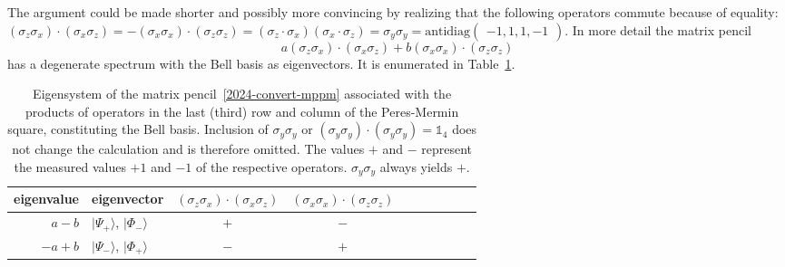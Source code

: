 \documentclass[
  twocolumn,
 showpacs,
 showkeys,
 preprintnumbers,
 amsmath,amssymb,
 aps,
 prl,
  longbibliography,
 floatfix,
 ]{revtex4-2}
\newcommand\myotimes{ }
\begin{document}
The argument could be made shorter and possibly more convincing by realizing that the following operators commute because of equality:
$
(\sigma_z \myotimes \sigma_x) \cdot (\sigma_x \myotimes \sigma_z) = -(\sigma_x \myotimes \sigma_x) \cdot (\sigma_z \myotimes \sigma_z)
=
(\sigma_z \cdot \sigma_x ) \myotimes (\sigma_x \cdot \sigma_z)
=   \sigma_y  \myotimes \sigma_y
= \text{antidiag}
\begin{pmatrix} -1 , 1 ,1, -1
\end{pmatrix}
$.
In more detail the matrix pencil
\begin{equation}
a(\sigma_z \myotimes \sigma_x) \cdot (\sigma_x \myotimes \sigma_z) + b (\sigma_x \myotimes \sigma_x) \cdot (\sigma_z \myotimes \sigma_z)
\label{2024-convert-mppm}
\end{equation}
has a degenerate spectrum with the Bell basis as eigenvectors. It is enumerated in Table~\ref{2024-convert-pm-es}.

\begin{table}[ht]
\caption{\label{2024-convert-pm-es}Eigensystem of the matrix pencil~\eqref{2024-convert-mppm}
associated with the products of operators in the last (third) row and column of the Peres-Mermin square,
constituting the Bell basis.
Inclusion of $\sigma_y \myotimes \sigma_y$ or $(\sigma_y \myotimes \sigma_y) \cdot (\sigma_y \myotimes \sigma_y) = \mathbb{1}_4$
does not change the calculation and is therefore omitted.
 The values $\boldsymbol{+}$ and $\boldsymbol{-}$ represent the measured values $+1$ and $-1$ of the respective operators. $\sigma_y \myotimes \sigma_y$ always yields $\boldsymbol{+}$.
}
\centering
\begin{ruledtabular}
\begin{tabular}{rlcccccccc}
 \multicolumn{1}{c}{eigenvalue}& \multicolumn{1}{c}{eigenvector} & $(\sigma_z \myotimes  \sigma_x) \cdot (\sigma_x\myotimes  \sigma_z)$ & $(\sigma_x \myotimes  \sigma_x) \cdot  (\sigma_z\myotimes  \sigma_z)$ \\
\hline
   $a - b$ &          $ \vert \Psi_+ \rangle $, $ \vert \Phi_- \rangle $   &   $\boldsymbol{+}$ &  $\boldsymbol{-}$          \\
   $-a + b$ &          $ \vert \Psi_- \rangle $, $ \vert \Phi_+ \rangle $   &   $\boldsymbol{-}$ &  $\boldsymbol{+}$          \\
\end{tabular}
\end{ruledtabular}
\end{table}
\end{document}
